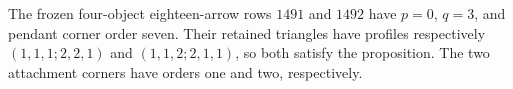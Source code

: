 \begin{remark*}
The frozen four-object eighteen-arrow rows $1491$ and
$1492$ have $p=0$, $q=3$, and pendant corner order seven.
Their retained triangles have profiles respectively
$(1,1,1;2,2,1)$ and $(1,1,2;2,1,1)$, so both satisfy
the proposition. The two attachment corners have orders
one and two, respectively.
\end{remark*}
